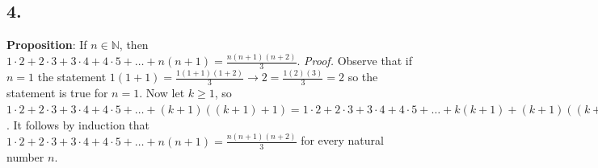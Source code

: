 \documentclass[12pt]{article}
\begin{document}
	\begin{minipage}[t]{0.45\textwidth}
		
		
		\subsection*{4.}
		\textbf{Proposition}: If $ n\in\mathbb{N} $, then $ 1\cdot2+2\cdot3+3\cdot4+4\cdot5+\dots+n(n+1)=\frac{n(n+1)(n+2)}{3} $.
		\newline\textit{Proof.}  Observe that if $ n=1 $ the statement $ 1(1+1)=\frac{1(1+1)(1+2)}{3}\rightarrow 2=\frac{1(2)(3)}{3}=2 $ so the statement is true for $ n=1 $. Now let $ k\geq 1 $, so  $ 1\cdot2+2\cdot3+3\cdot4+4\cdot5+\dots+(k+1)((k+1)+1) = 1\cdot2+2\cdot3+3\cdot4+4\cdot5+\dots+k(k+1)+(k+1)((k+1)+1) = \frac{k(k+1)(k+2)}{3} + (k+1)((k+1)+1) = \frac{k(k+1)(k+2)}{3} + (k+1)(k+2) = \frac{k(k+1)(k+2) +3(k+1)(k+2)}{3} = \frac{(k+1)(k+2)(k+3)}{3} = \frac{(k+1)((k+1)+1)((k+1)+2)}{3} $. It follows by induction that $ 1\cdot2+2\cdot3+3\cdot4+4\cdot5+\dots+n(n+1)=\frac{n(n+1)(n+2)}{3} $ for every natural number $ n $. 
		
		
	\end{minipage}
	\pagebreak
	
	
	
\end{document}
